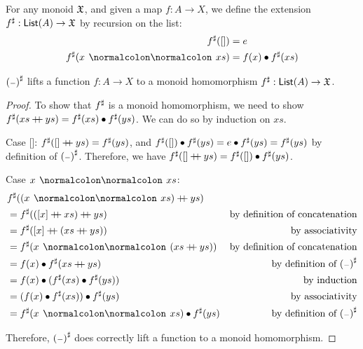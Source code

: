 \begin{definition}
    For any monoid $\mathfrak{X}$, and given a map $f : A \to X$,
    we define the extension ${f}^{\sharp} : \operatorname{\mathsf{List}}(A) \to \mathfrak{X}$ by recursion on the list:
    \begin{align*}
        \ext{f}([])         & = e                       \\
        \ext{f}(x \cons xs) & =  f(x) \mult \ext{f}(xs)
    \end{align*}
\end{definition}

\begin{propositionrep}
    ${({\scriptstyle{-}})}^{\sharp}$ lifts a function $f : A \to X$ to a monoid homomorphism ${f}^{\sharp} : \operatorname{\mathsf{List}}(A) \to \mathfrak{X}$.
\end{propositionrep}

\begin{proof}
    To show that ${f}^{\sharp}$ is a monoid homomorphism,
    we need to show ${f}^{\sharp}(xs \mathbin{+\kern -0.4em+} ys) = {f}^{\sharp}(xs) \mathbin{\bullet} {f}^{\sharp}(ys)$.
    We can do so by induction on $xs$.

    Case []:
    ${f}^{\sharp}([] \mathbin{+\kern -0.4em+} ys) = {f}^{\sharp}(ys)$,
    and ${f}^{\sharp}([]) \mathbin{\bullet} {f}^{\sharp}(ys) = e \mathbin{\bullet} {f}^{\sharp}(ys) = {f}^{\sharp}(ys)$
    by definition of ${({\scriptstyle{-}})}^{\sharp}$. Therefore, we have
    ${f}^{\sharp}([] \mathbin{+\kern -0.4em+} ys) = {f}^{\sharp}([]) \mathbin{\bullet} {f}^{\sharp}(ys)$.

    Case $x \cons xs$:
    \begin{align*}
         & \ext{f}((x \cons xs) \doubleplus ys)                                                        \\
         & = \ext{f}(([ x ] \doubleplus xs) \doubleplus ys) & \text{by definition of concatenation}    \\
         & = \ext{f}([ x ] \doubleplus (xs \doubleplus ys)) & \text{by associativity}                  \\
         & = \ext{f}(x \cons (xs \doubleplus ys))           & \text{by definition of concatenation}    \\
         & = f(x) \mult \ext{f}(xs \doubleplus ys)          & \text{by definition of $\ext{(\blank)}$} \\
         & = f(x) \mult (\ext{f}(xs) \mult \ext{f}(ys))     & \text{by induction}                      \\
         & = (f(x) \mult \ext{f}(xs)) \mult \ext{f}(ys)     & \text{by associativity}                  \\
         & = \ext{f}(x \cons xs) \mult \ext{f}(ys)          & \text{by definition of $\ext{(\blank)}$} \\
    \end{align*}

    Therefore, ${({\scriptstyle{-}})}^{\sharp}$ does correctly lift a function to a monoid homomorphism.
\end{proof}

